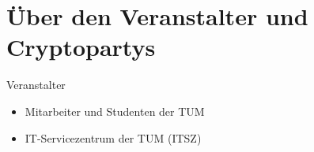 \section{Über den Veranstalter und Cryptopartys}
\begin{frame}{Veranstalter}
  \begin{itemize}
    \item Mitarbeiter und Studenten der TUM
    \item IT-Servicezentrum der TUM (ITSZ)
  \end{itemize}
\end{frame}

\endinput
